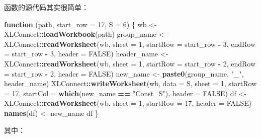 \documentclass[
]{krantz}
\makeatletter
\newenvironment{Shaded}{\begin{snugshade}}{\end{snugshade}}
\newcommand{\ControlFlowTok}[1]{\textcolor[rgb]{0.13,0.29,0.53}{\textbf{#1}}}
\newcommand{\DataTypeTok}[1]{\textcolor[rgb]{0.13,0.29,0.53}{#1}}
\newcommand{\DecValTok}[1]{\textcolor[rgb]{0.00,0.00,0.81}{#1}}
\newcommand{\KeywordTok}[1]{\textcolor[rgb]{0.13,0.29,0.53}{\textbf{#1}}}
\newcommand{\NormalTok}[1]{#1}
\newcommand{\OperatorTok}[1]{\textcolor[rgb]{0.81,0.36,0.00}{\textbf{#1}}}
\newcommand{\OtherTok}[1]{\textcolor[rgb]{0.56,0.35,0.01}{#1}}
\newcommand{\StringTok}[1]{\textcolor[rgb]{0.31,0.60,0.02}{#1}}
\newenvironment{kframe}{%
\medskip{}
\setlength{\fboxsep}{.8em}
 \def\at@end@of@kframe{}%
 \ifinner\ifhmode%
  \def\at@end@of@kframe{\end{minipage}}%
  \begin{minipage}{\columnwidth}%
 \fi\fi%
 \def\FrameCommand##1{\hskip\@totalleftmargin \hskip-\fboxsep
 \colorbox{shadecolor}{##1}\hskip-\fboxsep
     \hskip-\linewidth \hskip-\@totalleftmargin \hskip\columnwidth}%
 \MakeFramed {\advance\hsize-\width
   \@totalleftmargin\z@ \linewidth\hsize
   \@setminipage}}%
 {\par\unskip\endMakeFramed%
 \at@end@of@kframe}
\renewenvironment{Shaded}{\begin{kframe}}{\end{kframe}}
\makeatother
\begin{document}
函数的源代码其实很简单：

\begin{Shaded}
\begin{Highlighting}[]
\ControlFlowTok{function}\NormalTok{ (path, }\DataTypeTok{start_row =} \DecValTok{17}\NormalTok{, }\DataTypeTok{S =} \DecValTok{6}\NormalTok{) }
\NormalTok{\{}
\NormalTok{    wb <-}\StringTok{ }\NormalTok{XLConnect}\OperatorTok{::}\KeywordTok{loadWorkbook}\NormalTok{(path)}
\NormalTok{    group_name <-}\StringTok{ }\NormalTok{XLConnect}\OperatorTok{::}\KeywordTok{readWorksheet}\NormalTok{(wb, }\DataTypeTok{sheet =} \DecValTok{1}\NormalTok{, }\DataTypeTok{startRow =}\NormalTok{ start_row }\OperatorTok{-}\StringTok{ }
\StringTok{        }\DecValTok{3}\NormalTok{, }\DataTypeTok{endRow =}\NormalTok{ start_row }\OperatorTok{-}\StringTok{ }\DecValTok{3}\NormalTok{, }\DataTypeTok{header =} \OtherTok{FALSE}\NormalTok{)}
\NormalTok{    header_name <-}\StringTok{ }\NormalTok{XLConnect}\OperatorTok{::}\KeywordTok{readWorksheet}\NormalTok{(wb, }\DataTypeTok{sheet =} \DecValTok{1}\NormalTok{, }\DataTypeTok{startRow =}\NormalTok{ start_row }\OperatorTok{-}\StringTok{ }
\StringTok{        }\DecValTok{2}\NormalTok{, }\DataTypeTok{endRow =}\NormalTok{ start_row }\OperatorTok{-}\StringTok{ }\DecValTok{2}\NormalTok{, }\DataTypeTok{header =} \OtherTok{FALSE}\NormalTok{)}
\NormalTok{    new_name <-}\StringTok{ }\KeywordTok{paste0}\NormalTok{(group_name, }\StringTok{"_"}\NormalTok{, header_name)}
\NormalTok{    XLConnect}\OperatorTok{::}\KeywordTok{writeWorksheet}\NormalTok{(wb, }\DataTypeTok{data =}\NormalTok{ S, }\DataTypeTok{sheet =} \DecValTok{1}\NormalTok{, }\DataTypeTok{startRow =} \DecValTok{17}\NormalTok{, }
        \DataTypeTok{startCol =} \KeywordTok{which}\NormalTok{(new_name }\OperatorTok{==}\StringTok{ "Const_S"}\NormalTok{), }\DataTypeTok{header =} \OtherTok{FALSE}\NormalTok{)}
\NormalTok{    df <-}\StringTok{ }\NormalTok{XLConnect}\OperatorTok{::}\KeywordTok{readWorksheet}\NormalTok{(wb, }\DataTypeTok{sheet =} \DecValTok{1}\NormalTok{, }\DataTypeTok{startRow =} \DecValTok{17}\NormalTok{, }
        \DataTypeTok{header =} \OtherTok{FALSE}\NormalTok{)}
    \KeywordTok{names}\NormalTok{(df) <-}\StringTok{ }\NormalTok{new_name}
\NormalTok{    df}
\NormalTok{\}}
\end{Highlighting}
\end{Shaded}

其中：
\end{document}
